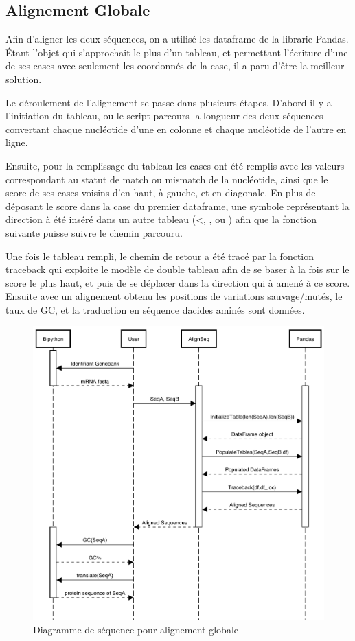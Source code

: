 \documentclass[11pt,french,]{article}
\begin{document}
\hypertarget{alignement-globale}{%
\subsection{Alignement Globale}\label{alignement-globale}}

Afin d'aligner les deux séquences, on a utilisé les dataframe de la
librarie Pandas. Étant l'objet qui s'approchait le plus d'un tableau, et
permettant l'écriture d'une de ses cases avec seulement les coordonnés
de la case, il a paru d'être la meilleur solution.

Le déroulement de l'alignement se passe dans plusieurs étapes. D'abord
il y a l'initiation du tableau, ou le script parcours la longueur des
deux séquences convertant chaque nucléotide d'une en colonne et chaque
nucléotide de l'autre en ligne.

\newpage

Ensuite, pour la remplissage du tableau les cases ont été remplis avec
les valeurs correspondant au statut de match ou mismatch de la
nucléotide, ainsi que le score de ses cases voisins d'en haut, à gauche,
et en diagonale. En plus de déposant le score dans la case du premier
dataframe, une symbole représentant la direction à été inséré dans un
autre tableau (\textless, , ou \textbar{} ) afin que la fonction
suivante puisse suivre le chemin parcouru.

Une fois le tableau rempli, le chemin de retour a été tracé par la
fonction traceback qui exploite le modèle de double tableau afin de se
baser à la fois sur le score le plus haut, et puis de se déplacer dans
la direction qui à amené à ce score. Ensuite avec un alignement obtenu
les positions de variations sauvage/mutés, le taux de GC, et la
traduction en séquence dacides aminés sont données.

\begin{figure}[H]
 \centering
 \includegraphics{../img/AlignmentGlobale.pdf}
 \caption{Diagramme de séquence pour alignement globale}
\end{figure}
\end{document}
